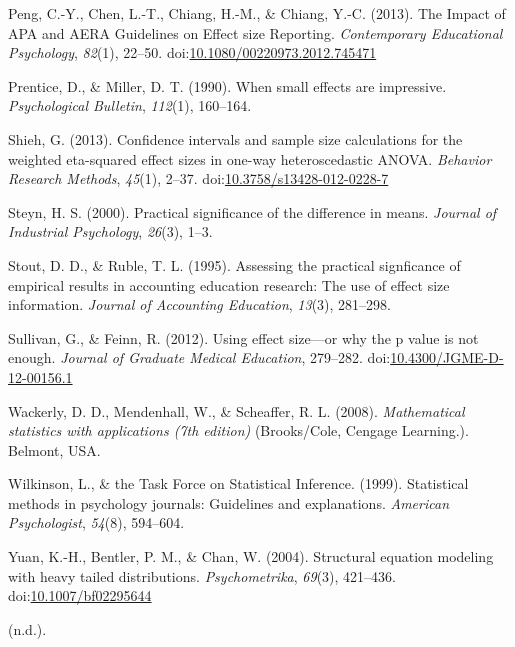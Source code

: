 \documentclass[man]{apa6}
\begin{document}
\leavevmode\hypertarget{ref-Peng_et_al_2013}{}%
Peng, C.-Y., Chen, L.-T., Chiang, H.-M., \& Chiang, Y.-C. (2013). The Impact of APA and AERA Guidelines on Effect size Reporting. \emph{Contemporary Educational Psychology}, \emph{82}(1), 22--50. doi:\href{https://doi.org/10.1080/00220973.2012.745471}{10.1080/00220973.2012.745471}

\leavevmode\hypertarget{ref-Prentice_Miller_1992}{}%
Prentice, D., \& Miller, D. T. (1990). When small effects are impressive. \emph{Psychological Bulletin}, \emph{112}(1), 160--164.

\leavevmode\hypertarget{ref-Shieh_2013}{}%
Shieh, G. (2013). Confidence intervals and sample size calculations for the weighted eta-squared effect sizes in one-way heteroscedastic ANOVA. \emph{Behavior Research Methods}, \emph{45}(1), 2--37. doi:\href{https://doi.org/10.3758/s13428-012-0228-7}{10.3758/s13428-012-0228-7}

\leavevmode\hypertarget{ref-Steyn_2000}{}%
Steyn, H. S. (2000). Practical significance of the difference in means. \emph{Journal of Industrial Psychology}, \emph{26}(3), 1--3.

\leavevmode\hypertarget{ref-Stout_Ruble_1995}{}%
Stout, D. D., \& Ruble, T. L. (1995). Assessing the practical signficance of empirical results in accounting education research: The use of effect size information. \emph{Journal of Accounting Education}, \emph{13}(3), 281--298.

\leavevmode\hypertarget{ref-Sullivan_Feinn_2012}{}%
Sullivan, G., \& Feinn, R. (2012). Using effect size---or why the p value is not enough. \emph{Journal of Graduate Medical Education}, 279--282. doi:\href{https://doi.org/10.4300/JGME-D-12-00156.1}{10.4300/JGME-D-12-00156.1}

\leavevmode\hypertarget{ref-Wackerly_et_al_2008}{}%
Wackerly, D. D., Mendenhall, W., \& Scheaffer, R. L. (2008). \emph{Mathematical statistics with applications (7th edition)} (Brooks/Cole, Cengage Learning.). Belmont, USA.

\leavevmode\hypertarget{ref-Wilkinson_1999}{}%
Wilkinson, L., \& the Task Force on Statistical Inference. (1999). Statistical methods in psychology journals: Guidelines and explanations. \emph{American Psychologist}, \emph{54}(8), 594--604.

\leavevmode\hypertarget{ref-Yuan_et_al_2004}{}%
Yuan, K.-H., Bentler, P. M., \& Chan, W. (2004). Structural equation modeling with heavy tailed distributions. \emph{Psychometrika}, \emph{69}(3), 421--436. doi:\href{https://doi.org/10.1007/bf02295644}{10.1007/bf02295644}

\leavevmode\hypertarget{ref-Keselman_et_al_2008}{}%
(n.d.).
\end{document}
